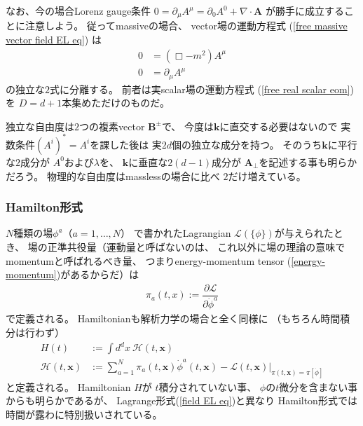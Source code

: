 \begin{enumerate}
    なお、今の場合Lorenz gauge条件
    $0 = \partial_\mu A^\mu
    = \partial_0 A^0 + \nabla \cdot \bm{A}$
    が勝手に成立することに注意しよう。
    従ってmassiveの場合、
    vector場の運動方程式
    (\ref{free massive vector field EL eq})
    は
    \begin{subequations}
    \begin{align}
        0
    &=
        (\Box - m^2) A^\mu
    \\
        0
    &=
        \partial_\mu A^\mu
    \end{align}
    \end{subequations}
    の独立な$2$式に分離する。
    前者は実scalar場の運動方程式
    (\ref{free real scalar eom})を
    $D = d + 1$本集めただけのものだ。

    独立な自由度は$2$つの複素vector $\bm{B}^\pm$で、
    今度は$\bm{k}$に直交する必要はないので
    実数条件$(A^i)^* = A^i$を課した後は
    実$2d$個の独立な成分を持つ。
    そのうち$\bm{k}$に平行な$2$成分が
    $A^0$および$\lambda$を、
    $\bm{k}$に垂直な$2(d-1)$成分が
    $\bm{A}_\perp$を記述する事も明らかだろう。
    物理的な自由度はmasslessの場合に比べ
    $2$だけ増えている。
\end{enumerate}

\subsubsection{Hamilton形式}

$N$種類の場$\phi^a$（$a = 1, \dots, N$）
で書かれたLagrangian
$\mathcal{L}(\{ \phi \})$が与えられたとき、
場の正準共役量（運動量と呼ばないのは、
これ以外に場の理論の意味でmomentumと呼ばれるべき量、
つまりenergy-momentum tensor (\ref{energy-momentum})があるからだ）は
\begin{align}
    \pi_a (t, x)
    := \dfrac{\partial \mathcal{L}}
        {\partial \dot{\phi}^a}
\end{align}
で定義される。
Hamiltonianも解析力学の場合と全く同様に
（もちろん時間積分は行わず）
\begin{subequations}
\begin{align}
    H (t)
    &:=
    \int d^d x\ 
        \mathcal{H} (t, \bm{x})
\\
    \mathcal{H} (t, \bm{x})
    &:=
    \sum_{a = 1}^N
        \pi_a (t, \bm{x})
        \dot{\phi}^a (t, \bm{x})
    -
    \mathcal{L}(t, \bm{x})
    \bigg|_{
        \pi(t, \bm{x})
        = \pi[\dot{\phi}]
    }
\end{align}
\end{subequations}
と定義される。
Hamiltonian $H$が
$t$積分されていない事、
$\phi$の$t$微分を含まない事からも明らかであるが、
Lagrange形式(\ref{field EL eq})と異なり
Hamilton形式では時間が露わに特別扱いされている。

